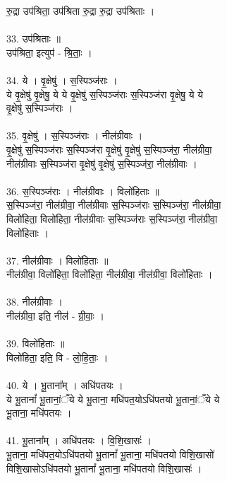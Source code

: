रु॒द्रा उप॑श्रिता॒ उप॑श्रिता रु॒द्रा रु॒द्रा उप॑श्रिताः ।\\
\\
33. उप॑श्रिताः ॥\\
उप॑श्रिता॒ इत्युप॑ - श्रि॒ताः॒ ।\\
\\
34. ये । वृ॒क्षेषु॑ । स॒स्पिञ्ज॑राः ।\\
ये वृ॒क्षेषु॑ वृ॒क्षेषु॒ ये ये वृ॒क्षेषु॑ स॒स्पिञ्ज॑राः स॒स्पिञ्ज॑रा वृ॒क्षेषु॒ ये ये\\
वृ॒क्षेषु॑ स॒स्पिञ्ज॑राः ।\\
\\
35. वृ॒क्षेषु॑ । स॒स्पिञ्ज॑राः । नील॑ग्रीवाः ।\\
वृ॒क्षेषु॑ स॒स्पिञ्ज॑राः स॒स्पिञ्ज॑रा वृ॒क्षेषु॑ वृ॒क्षेषु॑ स॒स्पिञ्ज॑रा॒ नील॑ग्रीवा॒\\
नील॑ग्रीवाः स॒स्पिञ्ज॑रा वृ॒क्षेषु॑ वृ॒क्षेषु॑ स॒स्पिञ्ज॑रा॒ नील॑ग्रीवाः ।\\
\\
36. स॒स्पिञ्ज॑राः । नील॑ग्रीवाः । विलो॑हिताः ॥\\
स॒स्पिञ्ज॑रा॒ नील॑ग्रीवा॒ नील॑ग्रीवाः स॒स्पिञ्ज॑राः स॒स्पिञ्ज॑रा॒ नील॑ग्रीवा॒\\
विलो॑हिता॒ विलो॑हिता॒ नील॑ग्रीवाः स॒स्पिञ्ज॑राः स॒स्पिञ्ज॑रा॒ नील॑ग्रीवा॒\\
विलो॑हिताः ।\\
\\
37. नील॑ग्रीवाः । विलो॑हिताः ॥\\
नील॑ग्रीवा॒ विलो॑हिता॒ विलो॑हिता॒ नील॑ग्रीवा॒ नील॑ग्रीवा॒ विलो॑हिताः ।\\
\\
38. नील॑ग्रीवाः ।\\
नील॑ग्रीवा॒ इति॒ नील॑ - ग्री॒वाः॒ ।\\
\\
39. विलो॑हिताः ॥\\
विलो॑हिता॒ इति॒ वि - लो॒हि॒ताः॒ ।\\
\\
40. ये । भू॒ताना᳚म् । अधि॑पतयः ।\\
ये भू॒तानां᳚ भू॒तानां॒ँये ये भू॒ताना॒ मधि॑पत॒योऽधि॑पतयो भू॒तानां॒ँये ये\\
भू॒ताना॒ मधि॑पतयः ।\\
\\
41. भू॒ताना᳚म् । अधि॑पतयः । वि॒शि॒खासः॑ ।\\
भू॒ताना॒ मधि॑पत॒योऽधि॑पतयो भू॒तानां᳚ भू॒ताना॒ मधि॑पतयो विशि॒खासो॑\\
विशि॒खासोऽधि॑पतयो भू॒तानां᳚ भू॒ताना॒ मधि॑पतयो विशि॒खासः॑ ।\\
